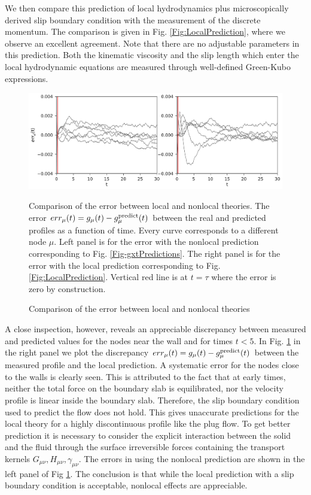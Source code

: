 \documentclass[b5paper,openright,10pt]{book}
\begin{document}
We  then   compare  this   prediction  of  local   hydrodynamics  plus
microscopically derived  slip boundary condition with  the measurement
of  the   discrete  momentum.   The   comparison  is  given   in  Fig.
\ref{Fig:LocalPrediction},  where we  observe  an excellent  agreement.
Note that there are no  adjustable parameters in this prediction. Both
the kinematic viscosity and the slip  length which enter the local hydrodynamic equations are
measured through well-defined Green-Kubo  expressions. 

\begin{figure}[]
\includegraphics[width=\linewidth]{errors-17nodes-WALLS}
\caption{Comparison of the error between local and nonlocal theories}{Comparison  of   the  error   between  local   and  nonlocal
  theories.  The error  $err_\mu(t)= g_\mu(t)-g^{\rm  predict}_\mu(t)$
  between the real and predicted profiles as a function of time. Every
  curve corresponds to  a different node $\mu$.  
  Left panel  is for the error with
  the     nonlocal      prediction     corresponding      to     Fig.
  \ref{Fig-gxtPredictions}.
  The right  panel is for
  the   error    with   the   local   prediction    corresponding   to
  Fig. \ref{Fig:LocalPrediction}. 
  Vertical red  line is at $t=\tau$  where the error
  is zero by construction.}
\label{Fig:err}
\end{figure}

A  close  inspection,  however,  reveals  an  appreciable
discrepancy between measured  and predicted values for  the nodes near
the wall and for times $t<5$. In Fig. \ref{Fig:err} in the right panel
we plot the discrepancy $err_\mu(t)=  g_\mu(t)-g^{\rm predict}_\mu(t)$ between the
measured profile and the local prediction. A systematic error for the nodes
close to the walls is clearly seen.  This  is attributed to the fact that at
early times, neither the  total force  on the boundary  slab is
equilibrated, nor the  velocity profile is linear  inside the boundary
slab.  Therefore, the slip boundary condition used to predict the flow
does not hold.  This gives unaccurate predictions for the local theory
for a highly discontinuous profile like  the plug flow.  To get better
prediction  it  is  necessary  to consider  the  explicit  interaction
between  the solid  and  the fluid  through  the surface  irreversible
forces         containing         the        transport         kernels
$G_{\mu\nu},H_{\mu\nu},\gamma_{\mu\nu}$.  The errors in using the nonlocal prediction 
are shown in the left panel of Fig \ref{Fig:err}. The conclusion is that while the local prediction
with a slip boundary condition is acceptable, nonlocal effects are appreciable.
\end{document}
